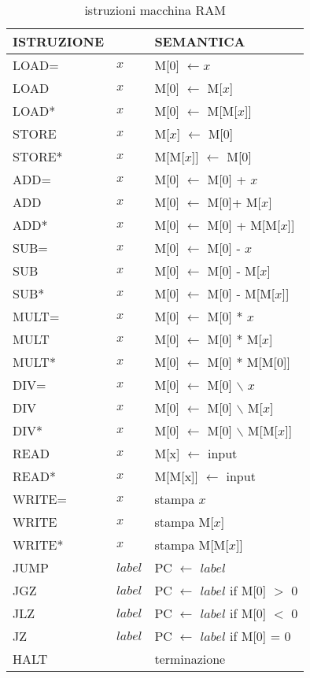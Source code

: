   \begin{table}[!h] 
    \caption{istruzioni macchina RAM}
    \vspace*{10pt}
    
    \centering
    \begin{tabular}{l l | l} \label{tabella istruzioni RAM}
      ISTRUZIONE & & SEMANTICA\\
      \hline
      LOAD= & \(x\) & M[0] \(\leftarrow x\)\\
      LOAD & \(x\)  & M[0] \(\leftarrow\) M[\(x\)]\\
      LOAD* & \(x\) & M[0] \(\leftarrow\) M[M[\(x\)]]\\
      STORE & \(x\) & M[\(x\)] \(\leftarrow\) M[0]\\
      STORE* & \(x\) & M[M[\(x\)]] \(\leftarrow\) M[0]\\
      ADD= & \(x\) & M[0] \(\leftarrow\) M[0] + \(x\)\\
      ADD  & \(x\)& M[0] \(\leftarrow\) M[0]+ M[\(x\)]\\
      ADD* & \(x\)& M[0] \(\leftarrow\) M[0] + M[M[\(x\)]]\\
      SUB= & \(x\)& M[0] \(\leftarrow\) M[0] - \(x\)\\
      SUB & \(x\)& M[0] \(\leftarrow\) M[0] - M[\(x\)]\\
      SUB* & \(x\)& M[0] \(\leftarrow\) M[0] - M[M[\(x\)]]\\
      MULT= & \(x\)& M[0] \(\leftarrow\) M[0] * \(x\)\\
      MULT & \(x\)& M[0] \(\leftarrow\) M[0] * M[\(x\)]\\
      MULT* & \(x\)& M[0] \(\leftarrow\) M[0] * M[M[0]]\\
      DIV= & \(x\)& M[0] \(\leftarrow\) M[0] \(\backslash\) \(x\) \\
      DIV & \(x\)& M[0] \(\leftarrow\) M[0] \(\backslash\) M[\(x\)]\\
      DIV* & \(x\)& M[0] \(\leftarrow\) M[0] \(\backslash\) M[M[\(x\)]]\\
      READ & \(x\)& M[x] \(\leftarrow\) input\\
      READ* & \(x\)& M[M[x]] \(\leftarrow\) input\\
      WRITE= & \(x\)& stampa \(x\)\\
      WRITE & \(x\)& stampa M[\(x\)]\\
      WRITE* & \(x\)& stampa M[M[\(x\)]]\\
      JUMP & \(label\)& PC \(\leftarrow\) \(label\) \\
      JGZ & \(label\)& PC \(\leftarrow\) \(label\) if M[0] \(>\) 0\\
      JLZ & \(label\)& PC \(\leftarrow\) \(label\) if M[0] \(<\) 0 \\
      JZ & \(label\)& PC \(\leftarrow\) \(label\) if M[0] = 0\\
      HALT & & terminazione\\
    \end{tabular}
  \end{table}

